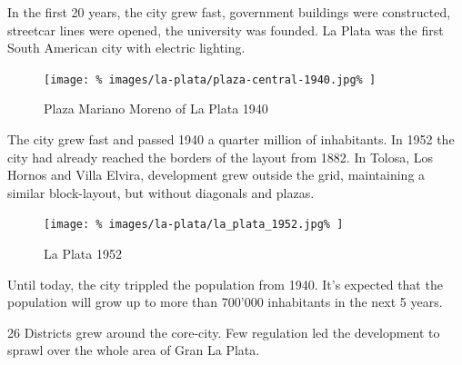 \documentclass{article}
\begin{document}
\begin{multicols}{2}
			
			
			In the first 20 years, the city grew fast, government buildings were constructed, streetcar lines were opened, the university was founded. La Plata was the first South American city with electric lighting.
			
			
			
			
			\begin{figure}[H]
				\texttt{[image: \%
					images/la-plata/plaza-central-1940.jpg\%
				]}
				\caption{Plaza Mariano Moreno of La Plata 1940  \cite{Blogspot:Arqruotolo:la-plata-o-la-geometria-hecha-espacio}}
				\label{fig:img:la-plata-1940}
			\end{figure}
			
			The city grew fast and passed 1940 a quarter million of inhabitants.
			In 1952 the city had already reached the borders of the layout from 1882. In Tolosa, Los Hornos and Villa Elvira, development grew outside the grid, maintaining a similar block-layout, but without diagonals and plazas.
			
			\begin{figure}[H]
				\texttt{[image: \%
					images/la-plata/la\_plata\_1952.jpg\%
				]}
				\caption{La Plata 1952 \cite{MOSP:InvestigacionHistorica}}
				\label{fig:map:la-plata-1952}
			\end{figure}
			
			
			Until today, the city trippled the population from 1940.
			It's expected that the population will grow up to more than 700'000 inhabitants in the next 5 years.
			
			
			
			26 Districts grew around the core-city. Few regulation led the development to sprawl over the whole area of Gran La Plata.
			

\end{multicols}
\end{document}
